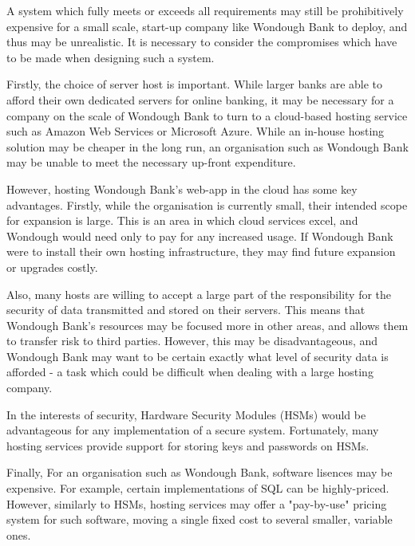 A system which fully meets or exceeds all requirements may still be prohibitively expensive for a small scale, start-up company like Wondough Bank to deploy, and thus may be unrealistic. It is necessary to consider the compromises which have to be made when designing such a system. 

Firstly, the choice of server host is important. While larger banks are able to afford their own dedicated servers for online banking, it may be necessary for a company on the scale of Wondough Bank to turn to a cloud-based hosting service such as Amazon Web Services or Microsoft Azure. While an in-house hosting solution may be cheaper in the long run, an organisation such as Wondough Bank may be unable to meet the necessary up-front expenditure.

However, hosting Wondough Bank's web-app in the cloud has some key advantages. Firstly, while the organisation is currently small, their intended scope for expansion is large. This is an area in which cloud services excel, and Wondough would need only to pay for any increased usage. If Wondough Bank were to install their own hosting infrastructure, they may find future expansion or upgrades costly.

Also, many hosts are willing to accept a large part of the responsibility for the security of data transmitted and stored on their servers. This means that Wondough Bank's resources may be focused more in other areas, and allows them to transfer risk to third parties. However, this may be disadvantageous, and Wondough Bank may want to be certain exactly what level of security data is afforded - a task which could be difficult when dealing with a large hosting company.

In the interests of security, Hardware Security Modules (HSMs) would be advantageous for any implementation of a secure system. Fortunately, many hosting services provide support for storing keys and passwords on HSMs.

Finally, For an organisation such as Wondough Bank, software lisences may be expensive. For example, certain implementations of SQL can be highly-priced. However, similarly to HSMs, hosting services may offer a "pay-by-use" pricing system for such software, moving a single fixed cost to several smaller, variable ones.

